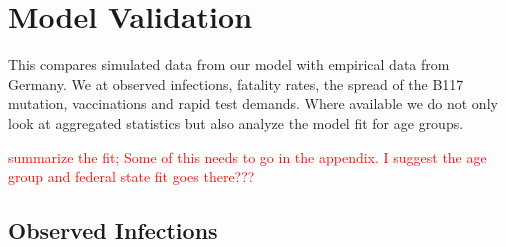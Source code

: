 \section{Model Validation}
\label{sec:model_validation}

This compares simulated data from our model with empirical data from Germany. We at
observed infections, fatality rates, the spread of the B117 mutation, vaccinations and
rapid test demands. Where available we do not only look at aggregated statistics but
also analyze the model fit for age groups.

\textcolor{red}{summarize the fit; Some of this needs to go in the appendix. I suggest the age group and federal state fit goes there???}


\subsection{Observed Infections}
\label{sub:in_sample_fit}




